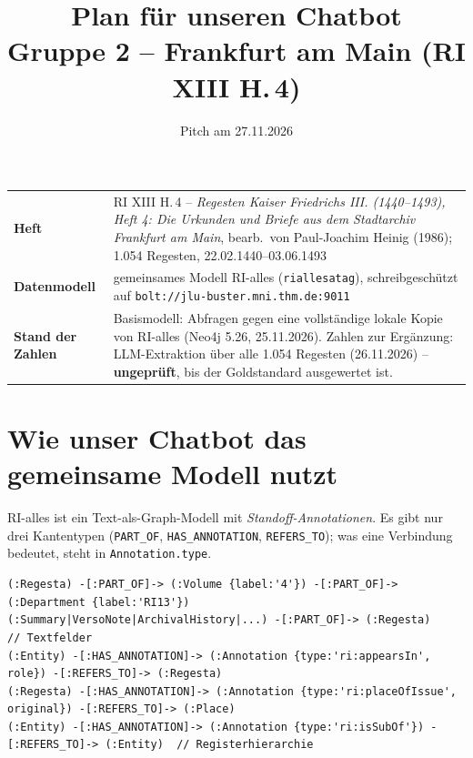 \documentclass[10pt,a4paper]{article}
\title{\vspace{-1.5cm}Plan für unseren Chatbot\\[2pt]\large Gruppe 2 -- Frankfurt am Main (RI XIII H.\,4)}
\author{}
\date{Pitch am 27.11.2026}
\newcommand{\code}[1]{\texttt{\small #1}}
\begin{document}
\maketitle
\vspace{-1.2cm}

\begin{center}\small
\begin{tabularx}{\textwidth}{@{}lL@{}}
\textbf{Heft} & RI XIII H.\,4 -- \emph{Regesten Kaiser Friedrichs III. (1440--1493), Heft 4: Die Urkunden und Briefe aus dem Stadtarchiv Frankfurt am Main}, bearb.\ von Paul-Joachim Heinig (1986); 1.054 Regesten, 22.02.1440--03.06.1493\\
\textbf{Datenmodell} & gemeinsames Modell RI-alles (\code{riallesatag}), schreibgeschützt auf \code{bolt://jlu-buster.mni.thm.de:9011}\\
\textbf{Stand der Zahlen} & Basismodell: Abfragen gegen eine vollständige lokale Kopie von RI-alles (Neo4j 5.26, 25.11.2026). Zahlen zur Ergänzung: LLM-Extraktion über alle 1.054 Regesten (26.11.2026) -- \textbf{ungeprüft}, bis der Goldstandard ausgewertet ist.\\
\end{tabularx}
\end{center}

\section{Wie unser Chatbot das gemeinsame Modell nutzt}

RI-alles ist ein Text-als-Graph-Modell mit \emph{Standoff-Annotationen}. Es gibt nur drei Kantentypen (\code{PART\_OF}, \code{HAS\_ANNOTATION}, \code{REFERS\_TO}); was eine Verbindung bedeutet, steht in \code{Annotation.type}.

\begin{lstlisting}
(:Regesta) -[:PART_OF]-> (:Volume {label:'4'}) -[:PART_OF]-> (:Department {label:'RI13'})
(:Summary|VersoNote|ArchivalHistory|...) -[:PART_OF]-> (:Regesta)                    // Textfelder
(:Entity) -[:HAS_ANNOTATION]-> (:Annotation {type:'ri:appearsIn', role}) -[:REFERS_TO]-> (:Regesta)
(:Regesta) -[:HAS_ANNOTATION]-> (:Annotation {type:'ri:placeOfIssue', original}) -[:REFERS_TO]-> (:Place)
(:Entity) -[:HAS_ANNOTATION]-> (:Annotation {type:'ri:isSubOf'}) -[:REFERS_TO]-> (:Entity)  // Registerhierarchie
\end{lstlisting}
\end{document}
